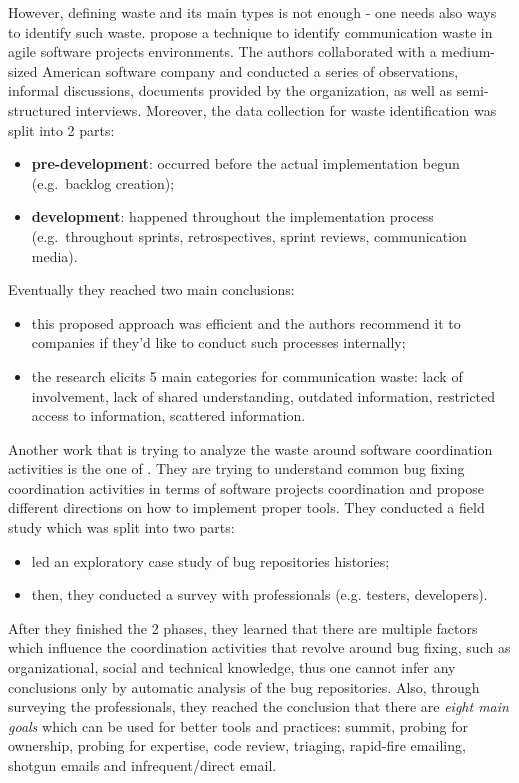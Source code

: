 \documentclass{mprop}
\begin{document}
However, defining waste and its main types is not enough - one needs also
ways to identify such waste. \citet{Korkala2014WasteIdentification} propose a
technique to identify communication waste in agile software projects 
environments. The authors collaborated with a medium-sized American software 
company and conducted a series of observations, informal discussions, documents 
provided by the organization, as well as semi-structured interviews. Moreover,
the data collection for waste identification was split into 2 parts:
  \begin{itemize}
    \item \textbf{pre-development}: occurred before the actual implementation
      begun (e.g.\ backlog creation);
    \item \textbf{development}: happened throughout the implementation
      process (e.g.\ throughout sprints, retrospectives, sprint reviews,
      communication media).
  \end{itemize}
Eventually they reached two main conclusions:
  \begin{itemize}
    \item this proposed approach was efficient and the authors recommend it to
      companies if they'd like to conduct such processes internally;
    \item the research elicits 5 main categories for communication waste: lack
      of involvement, lack of shared understanding, outdated information, 
      restricted access to information, scattered information.
  \end{itemize}

Another work that is trying to analyze the waste around software coordination activities
is the one of \citet{aranda2009secret}. They are trying to understand common bug fixing
coordination activities in terms of software projects coordination and propose different
directions on how to implement proper tools. They conducted a field study which was
split into two parts:
  \begin{itemize}
    \item led an exploratory case study of bug repositories histories;
    \item then, they conducted a survey with professionals (e.g. testers, developers).
  \end{itemize}
After they finished the 2 phases, they learned that there are multiple factors which
influence the coordination activities that revolve around bug fixing, such as organizational,
social and technical knowledge, thus one cannot infer any conclusions only by automatic analysis 
of the bug repositories. Also, through surveying the professionals, they reached the conclusion
that there are \emph{eight main goals} which can be used for better tools and practices: summit, 
probing for ownership, probing for expertise, code review, triaging, rapid-fire emailing, 
shotgun emails and infrequent/direct email.
\end{document}
